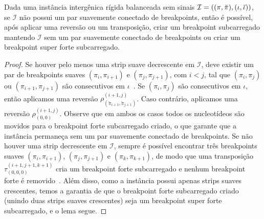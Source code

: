 \begin{lemma}\label{lemma:OJTODIFY}
Dada uma instância intergênica rígida balanceada sem sinais $\mathcal{I}=((\pi,\breve\pi),\break(\iota,\breve\iota))$, se $\mathcal{I}$ não possui um par suavemente conectado de breakpoints, então é possível, após aplicar uma reversão ou um transposição, criar um breakpoint subcarregado mantendo $\mathcal{I}$ sem um par suavemente conectado de breakpoints ou criar um breakpoint super forte subcarregado.
\end{lemma}
\begin{proof}
Se houver pelo menos uma strip suave decrescente em $\mathcal{I}$, deve existir um par de breakpoints suaves $(\pi_{i},\pi_{i+1})$ e $(\pi_{j},\pi_ {j+1})$, com $i <j$, tal que $(\pi_{i},\pi_{j})$ ou $(\pi_{i+1},\pi_{j+1} )$ são consecutivos em $\iota$~\cite{1995-kececioglu-sankoff}. Se $(\pi_{i},\pi_{j})$ são consecutivos em $\iota$, então aplicamos uma reversão $\rho_{(\breve\pi_{i+1},\breve\pi_{j +1})}^{(i+1, j)}$. Caso contrário, aplicamos uma reversão $\rho_{(0, 0)}^{(i+1, j)}$. Observe que em ambos os casos todos os nucleotídeos são movidos para o breakpoint forte subcarregado criado, o que garante que a instância permaneça sem um par suavemente conectado de breakpoints. Se não houver uma strip decrescente em $\mathcal{I}$, sempre é possível encontrar três breakpoints suaves $(\pi_{i},\pi_{i+1})$, $(\pi_{j},\pi_{ j+1})$ e $(\pi_{k},\pi_{k+1})$, de modo que uma transposição $\tau_{(0,0,0)}^{(i+1,j +1,k+1)}$ cria um breakpoint forte subcarregado e nenhum breakpoint forte é removido~\cite{1998-walter-etal}. Além disso, como a instância possui apenas strips suaves crescentes, temos a garantia de que o breakpoint forte subcarregado criado (unindo duas strips suaves crescentes) seja um breakpoint super forte subcarregado, e o lema segue.
\end{proof}

